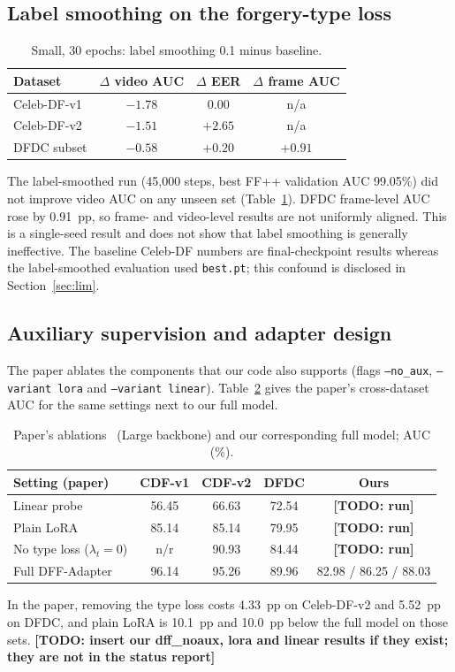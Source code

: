 \documentclass[lettersize,journal]{IEEEtran}
\newcommand{\todo}[1]{\textbf{[TODO: #1]}}
\begin{document}
\subsection{Label smoothing on the forgery-type loss}
\begin{table}[!t]
\caption{Small, 30 epochs: label smoothing 0.1 minus baseline.\label{tab:ls}}
\centering
\footnotesize
\begin{tabular}{|l||c|c|c|}
\hline
Dataset & $\Delta$ video AUC & $\Delta$ EER & $\Delta$ frame AUC\\
\hline
Celeb-DF-v1 & $-1.78$ & $0.00$ & n/a\\
Celeb-DF-v2 & $-1.51$ & $+2.65$ & n/a\\
DFDC subset & $-0.58$ & $+0.20$ & $+0.91$\\
\hline
\end{tabular}
\end{table}
The label-smoothed run (45{,}000 steps, best FF++ validation AUC 99.05\%) did not improve video AUC on any unseen set (Table~\ref{tab:ls}). DFDC frame-level AUC rose by 0.91~pp, so frame- and video-level results are not uniformly aligned. This is a single-seed result and does not show that label smoothing is generally ineffective. The baseline Celeb-DF numbers are final-checkpoint results whereas the label-smoothed evaluation used \texttt{best.pt}; this confound is disclosed in Section~\ref{sec:lim}.

\subsection{Auxiliary supervision and adapter design}\label{sec:paperabl}
The paper ablates the components that our code also supports (flags \texttt{--no\_aux}, \texttt{--variant lora} and \texttt{--variant linear}). Table~\ref{tab:paperabl} gives the paper's cross-dataset AUC for the same settings next to our full model.
\begin{table}[!t]
\caption{Paper's ablations~\cite{zhang2026dff} (Large backbone) and our corresponding full model; AUC (\%).\label{tab:paperabl}}
\centering
\footnotesize
\setlength{\tabcolsep}{3pt}
\begin{tabular}{|l||c|c|c|c|}
\hline
Setting (paper) & CDF-v1 & CDF-v2 & DFDC & Ours\\
\hline
Linear probe & 56.45 & 66.63 & 72.54 & \todo{run}\\
Plain LoRA & 85.14 & 85.14 & 79.95 & \todo{run}\\
No type loss ($\lambda_t{=}0$) & n/r & 90.93 & 84.44 & \todo{run}\\
Full DFF-Adapter & 96.14 & 95.26 & 89.96 & 82.98 / 86.25 / 88.03\\
\hline
\end{tabular}
\end{table}
In the paper, removing the type loss costs 4.33~pp on Celeb-DF-v2 and 5.52~pp on DFDC, and plain LoRA is 10.1~pp and 10.0~pp below the full model on those sets. \todo{insert our dff\_noaux, lora and linear results if they exist; they are not in the status report}
\end{document}
